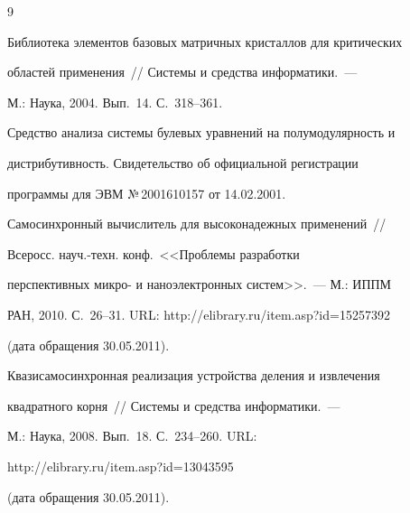 {{\begin{thebibliography}{9}


Библиотека элементов базовых матричных кристаллов для критических 


областей применения~/\!\!/ Системы и средства информатики.~--- 


М.: Наука, 2004.  Вып.~14. С.~318--361.









Средство анализа системы булевых уравнений на полумодулярность и 


дистрибутивность. Свидетельство об официальной регистрации 


программы для ЭВМ №\,2001610157 от 14.02.2001.















Самосинхронный вычислитель для высоконадежных применений~/\!\!/  


Всеросс. науч.-техн. конф.\ <<Проб\-ле\-мы разработки 


перспективных микро- и наноэлектронных сис\-тем>>.~--- М.: ИППМ 


РАН, 2010. С.~26--31. URL: {\sf http://elibrary.ru/item.asp?id=15257392} 


(дата обращения 30.05.2011).





 \label{end\stat}









Квазисамосинхронная реализация устройства деления и извлечения 


квадратного корня~/\!\!/ Системы и средства информатики.~--- 


М.: Наука, 2008.   Вып.~18. С.~234--260. URL: {\sf 


http://elibrary.ru/item.asp?id=13043595} (дата обращения 30.05.2011).





 \end{thebibliography}


}


}


